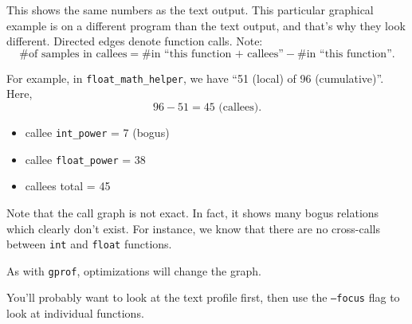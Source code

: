 This shows the same numbers as the text output. This particular graphical example is on a different program than the text output, and that's why they look different. Directed edges denote function calls.
Note: 
\[ \mbox{\# of samples in callees} = \mbox{\# in ``this function + callees''} - \mbox{\# in ``this function''}.\]

For example, in {\tt float\_math\_helper}, we have ``51 (local) of 96 (cumulative)''.
Here,
\[ 96 - 51 = 45 \mbox{ (callees)}. \]
      \begin{itemize}
        \item callee {\tt int\_power} = 7 (bogus)
        \item callee {\tt float\_power} = 38
        \item callees total = 45
      \end{itemize}

Note that the call graph is not exact.
In fact, it shows many bogus relations which clearly don't exist.
For instance, we know that there are no cross-calls between {\tt int} and {\tt float} functions.

As with {\tt gprof}, optimizations will change the
      graph.\

You'll probably want to look at the text profile first, then use the
      {\tt --focus} flag to look at individual functions.






